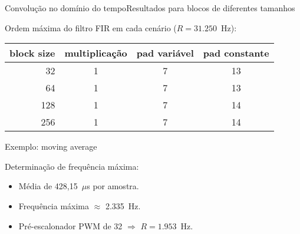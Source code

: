 
{Convolução no domínio do tempo}{Resultados para blocos de diferentes tamanhos}



Ordem máxima do filtro FIR em cada cenário ($R=31.250$~Hz):

\begin{center}
\begin{tabular}{rccc}
\toprule
\toprule
\footnotesize{block size}  & \footnotesize{multiplicação} & \footnotesize{pad variável} & \footnotesize{pad constante} \\
\midrule
32  & 1 & 7 & 13 \\
64  & 1 & 7 & 13 \\
128 & 1 & 7 & 14 \\
256 & 1 & 7 & 14 \\
\bottomrule
\end{tabular}
\end{center}

{Exemplo: moving average}


%



Determinação de frequência máxima:
\begin{itemize}
  \item Média de 428,15~$\mu$s por amostra.
  \item Frequência máxima $\approx$ 2.335~Hz.
  \item Pré-escalonador PWM de 32 $\Rightarrow$ $R=1.953$~Hz.
\end{itemize}



